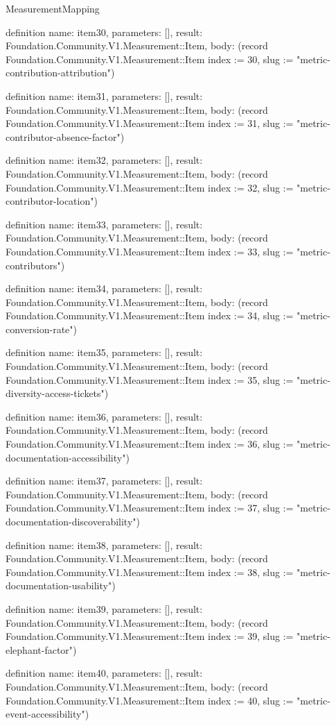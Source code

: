 \begin{lexlean}{MeasurementMapping}
\begin{semanticmodule}
definition{
  name: item30,
  parameters: [],
  result: Foundation.Community.V1.Measurement::Item,
  body: (record Foundation.Community.V1.Measurement::Item {index := 30, slug := "metric-contribution-attribution"})
}

definition{
  name: item31,
  parameters: [],
  result: Foundation.Community.V1.Measurement::Item,
  body: (record Foundation.Community.V1.Measurement::Item {index := 31, slug := "metric-contributor-absence-factor"})
}

definition{
  name: item32,
  parameters: [],
  result: Foundation.Community.V1.Measurement::Item,
  body: (record Foundation.Community.V1.Measurement::Item {index := 32, slug := "metric-contributor-location"})
}

definition{
  name: item33,
  parameters: [],
  result: Foundation.Community.V1.Measurement::Item,
  body: (record Foundation.Community.V1.Measurement::Item {index := 33, slug := "metric-contributors"})
}

definition{
  name: item34,
  parameters: [],
  result: Foundation.Community.V1.Measurement::Item,
  body: (record Foundation.Community.V1.Measurement::Item {index := 34, slug := "metric-conversion-rate"})
}

definition{
  name: item35,
  parameters: [],
  result: Foundation.Community.V1.Measurement::Item,
  body: (record Foundation.Community.V1.Measurement::Item {index := 35, slug := "metric-diversity-access-tickets"})
}

definition{
  name: item36,
  parameters: [],
  result: Foundation.Community.V1.Measurement::Item,
  body: (record Foundation.Community.V1.Measurement::Item {index := 36, slug := "metric-documentation-accessibility"})
}

definition{
  name: item37,
  parameters: [],
  result: Foundation.Community.V1.Measurement::Item,
  body: (record Foundation.Community.V1.Measurement::Item {index := 37, slug := "metric-documentation-discoverability"})
}

definition{
  name: item38,
  parameters: [],
  result: Foundation.Community.V1.Measurement::Item,
  body: (record Foundation.Community.V1.Measurement::Item {index := 38, slug := "metric-documentation-usability"})
}

definition{
  name: item39,
  parameters: [],
  result: Foundation.Community.V1.Measurement::Item,
  body: (record Foundation.Community.V1.Measurement::Item {index := 39, slug := "metric-elephant-factor"})
}

definition{
  name: item40,
  parameters: [],
  result: Foundation.Community.V1.Measurement::Item,
  body: (record Foundation.Community.V1.Measurement::Item {index := 40, slug := "metric-event-accessibility"})
}


\end{semanticmodule}
\end{lexlean}
